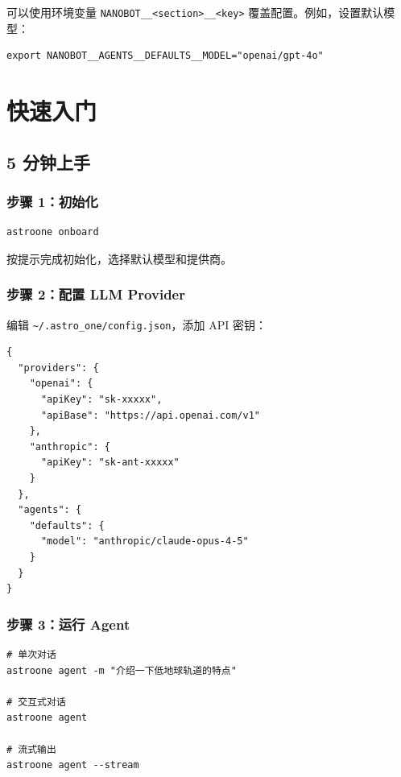 \documentclass[12pt,a4paper,UTF8]{ctexart}
\begin{document}
\begin{tipbox}
可以使用环境变量 \texttt{NANOBOT\_\_<section>\_\_<key>} 覆盖配置。例如，设置默认模型：
\begin{verbatim}
export NANOBOT__AGENTS__DEFAULTS__MODEL="openai/gpt-4o"
\end{verbatim}
\end{tipbox}

\chapter{快速入门}

\section{5 分钟上手}

\subsection{步骤 1：初始化}
\begin{verbatim}
astroone onboard
\end{verbatim}
按提示完成初始化，选择默认模型和提供商。

\subsection{步骤 2：配置 LLM Provider}
编辑 \texttt{\textasciitilde/.astro\_one/config.json}，添加 API 密钥：

\begin{verbatim}
{
  "providers": {
    "openai": {
      "apiKey": "sk-xxxxx",
      "apiBase": "https://api.openai.com/v1"
    },
    "anthropic": {
      "apiKey": "sk-ant-xxxxx"
    }
  },
  "agents": {
    "defaults": {
      "model": "anthropic/claude-opus-4-5"
    }
  }
}
\end{verbatim}

\subsection{步骤 3：运行 Agent}
\begin{verbatim}
# 单次对话
astroone agent -m "介绍一下低地球轨道的特点"

# 交互式对话
astroone agent

# 流式输出
astroone agent --stream
\end{verbatim}
\end{document}
